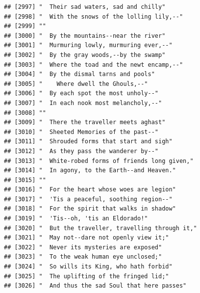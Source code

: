 \documentclass{article}\usepackage[]{graphicx}\usepackage[]{color}
\makeatletter
\newenvironment{kframe}{%
 \def\at@end@of@kframe{}%
 \ifinner\ifhmode%
  \def\at@end@of@kframe{\end{minipage}}%
  \begin{minipage}{\columnwidth}%
 \fi\fi%
 \def\FrameCommand##1{\hskip\@totalleftmargin \hskip-\fboxsep
 \colorbox{shadecolor}{##1}\hskip-\fboxsep
     \hskip-\linewidth \hskip-\@totalleftmargin \hskip\columnwidth}%
 \MakeFramed {\advance\hsize-\width
   \@totalleftmargin\z@ \linewidth\hsize
   \@setminipage}}%
 {\par\unskip\endMakeFramed%
 \at@end@of@kframe}
\newenvironment{knitrout}{}{} %
\makeatother
\begin{document}
\begin{knitrout}
\begin{kframe}
\begin{verbatim}
## [2997] "  Their sad waters, sad and chilly"                                          
## [2998] "  With the snows of the lolling lily,--"                                     
## [2999] ""                                                                            
## [3000] "  By the mountains--near the river"                                          
## [3001] "  Murmuring lowly, murmuring ever,--"                                        
## [3002] "  By the gray woods,--by the swamp"                                          
## [3003] "  Where the toad and the newt encamp,--"                                     
## [3004] "  By the dismal tarns and pools"                                             
## [3005] "    Where dwell the Ghouls,--"                                               
## [3006] "  By each spot the most unholy--"                                            
## [3007] "  In each nook most melancholy,--"                                           
## [3008] ""                                                                            
## [3009] "  There the traveller meets aghast"                                          
## [3010] "  Sheeted Memories of the past--"                                            
## [3011] "  Shrouded forms that start and sigh"                                        
## [3012] "  As they pass the wanderer by--"                                            
## [3013] "  White-robed forms of friends long given,"                                  
## [3014] "  In agony, to the Earth--and Heaven."                                       
## [3015] ""                                                                            
## [3016] "  For the heart whose woes are legion"                                       
## [3017] "  'Tis a peaceful, soothing region--"                                        
## [3018] "  For the spirit that walks in shadow"                                       
## [3019] "  'Tis--oh, 'tis an Eldorado!"                                               
## [3020] "  But the traveller, travelling through it,"                                 
## [3021] "  May not--dare not openly view it;"                                         
## [3022] "  Never its mysteries are exposed"                                           
## [3023] "  To the weak human eye unclosed;"                                           
## [3024] "  So wills its King, who hath forbid"                                        
## [3025] "  The uplifting of the fringed lid;"                                         
## [3026] "  And thus the sad Soul that here passes"                                    

\end{verbatim}
\end{kframe}
\end{knitrout}
\end{document}
